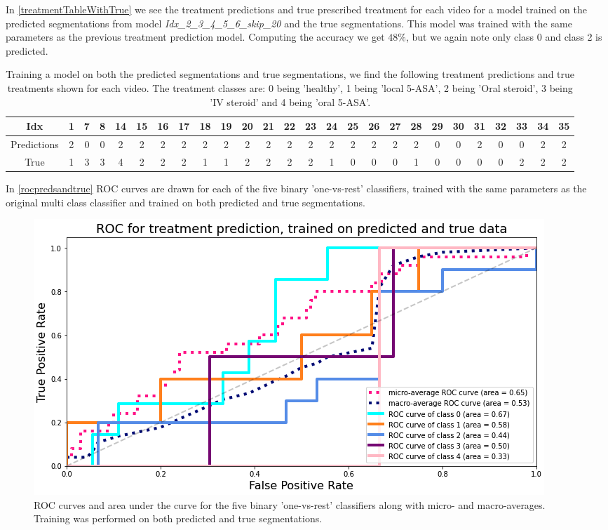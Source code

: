 In \autoref{treatmentTableWithTrue} we see the treatment predictions and true prescribed treatment for each video for a model trained on the predicted segmentations from model \textit{Idx\_2\_3\_4\_5\_6\_skip\_20} and the true segmentations. This model was trained with the same parameters as the previous treatment prediction model. Computing the accuracy we get $48\%$, but we again note only class 0 and class 2 is predicted.
\begin{table}[H]
	\hspace{-2.7cm}
	\begin{tabular}{|c|c|c|c|c|c|c|c|c|c|c|c|c|c|c|c|c|c|c|c|c|c|c|c|c|c|}
		\hline
		Idx&1
		&7
		&8
		&14
		&15
		&16
		&17
		&18
		&19
		&20
		&21
		&22
		&23
		&24
		&25
		&26
		&27
		&28
		&29
		&30
		&31
		&32
		&33
		&34
		&35\\\hline\hline
		Predictions&2
		&0
		&0
		&2
		&2
		&2
		&2
		&2
		&2
		&2
		&2
		&2
		&2
		&2
		&2
		&2
		&2
		&2
		&0
		&0
		&2
		&0
		&0
		&2
		&2\\\hline
		True&1
		&3
		&3
		&4
		&2
		&2
		&2
		&1
		&1
		&2
		&2
		&2
		&2
		&1
		&0
		&0
		&0
		&1
		&0
		&0
		&0
		&0
		&2
		&2
		&2\\\hline
	\end{tabular}
	\caption{Training a model on both the predicted segmentations and true segmentations, we find the following treatment predictions and true treatments shown for each video. The treatment classes are: 0 being 'healthy', 1 being 'local 5-ASA', 2 being 'Oral steroid', 3 being 'IV steroid' and 4 being 'oral 5-ASA'.}
	\label{treatmentTableWithTrue}
\end{table}

In \autoref{rocpredsandtrue} ROC curves are drawn for each of the five binary 'one-vs-rest' classifiers, trained with the same parameters as the original multi class classifier and trained on both predicted and true segmentations.

\begin{figure}[H]
	\centering
	\includegraphics[width=0.85\linewidth]{Materials/Results/Treatment/RocPredsAndTrue}
	\caption{ROC curves and area under the curve for the five binary 'one-vs-rest' classifiers along with micro- and macro-averages. Training was performed on both predicted and true segmentations.}
	\label{rocpredsandtrue}
\end{figure}